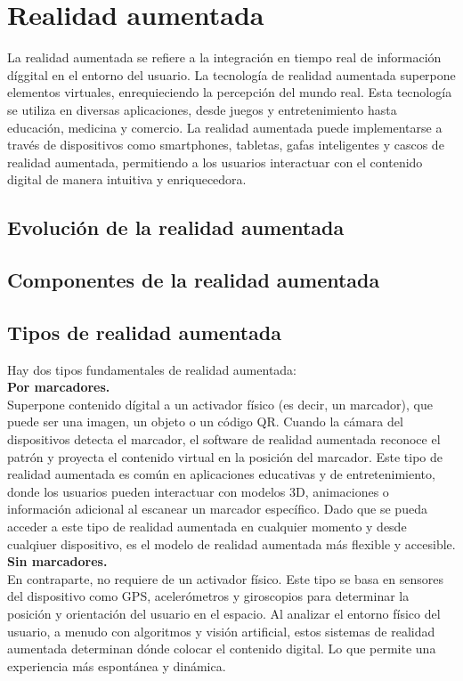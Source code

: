 \section{Realidad aumentada}
La realidad aumentada se refiere a la integración en tiempo real de información díggital
en el entorno del usuario. La tecnología de realidad aumentada superpone elementos virtuales,
enrequieciendo la percepción del mundo real. Esta tecnología se utiliza en diversas aplicaciones,
desde juegos y entretenimiento hasta educación, medicina y comercio. 
La realidad aumentada puede implementarse a través de dispositivos como smartphones, tabletas, gafas inteligentes y cascos de realidad aumentada, 
permitiendo a los usuarios interactuar con el contenido digital de manera intuitiva y enriquecedora.
\subsection {Evolución de la realidad aumentada} 
\subsection {Componentes de la realidad aumentada}
\subsection{Tipos de realidad aumentada}
	Hay dos tipos fundamentales de realidad aumentada: \\
	\textbf {Por marcadores.} \\
	Superpone contenido dígital a un activador físico (es decir, un marcador), que puede ser una imagen, un objeto o un código QR.
	Cuando la cámara del dispositivos detecta el marcador, el software de realidad aumentada reconoce el patrón y proyecta el contenido virtual en la posición del marcador.
	Este tipo de realidad aumentada es común en aplicaciones educativas y de entretenimiento, 
	donde los usuarios pueden interactuar con modelos 3D, animaciones o información adicional al escanear un marcador específico.
	Dado que se pueda acceder a este tipo de realidad aumentada en cualquier momento y desde cualqiuer dispositivo,
	es el modelo de realidad aumentada más flexible y accesible. \\
	\textbf {Sin marcadores.} \\
	En contraparte, no requiere de un activador físico. Este tipo se basa en sensores del dispositivo como GPS, acelerómetros y giroscopios para determinar la posición y orientación del usuario en el espacio.
	Al analizar el entorno físico del usuario, a menudo con algoritmos y visión artificial, estos sistemas de realidad aumentada determinan dónde colocar el contenido digital.
	Lo que permite una experiencia más espontánea y dinámica.